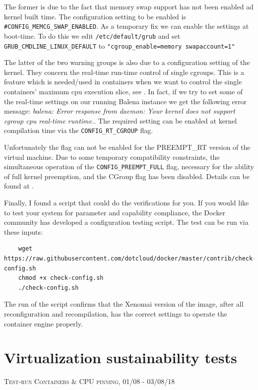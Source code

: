 \documentclass[]{scrartcl}
\begin{document}
The former is due to the fact that memory swap support has not been enabled ad kernel built time. 
The configuration setting to be enabled is \texttt{\#CONFIG\_MEMCG\_SWAP\_ENABLED}. As a temporary fix we can enable the settings at boot-time. 
To do this we edit \texttt{/etc/default/grub} and set 
\texttt{GRUB\_CMDLINE\_LINUX\_DEFAULT} to \texttt{"cgroup\_enable=memory swapaccount=1"}

The latter of the two warning groups is also due to a configuration setting of the kernel. They concern the real-time run-time control of single cgroups. This is a feature which is needed/used in containers when we want to control the single containers' maximum cpu execution slice, see \cite{docker04}. 
In fact, if we try to set some of the real-time settings on our running Balena instance we get the following error message: \textit{balena: Error response from daemon: Your kernel does not support cgroup cpu real-time runtime.}.
The required setting can be enabled at kernel compilation time via the \texttt{CONFIG\_RT\_CGROUP} flag. 

Unfortunately the flag can not be enabled for the PREEMPT\_RT version of the virtual machine. Due to some temporary compatibility constraints, the simultaneous operation of the \texttt{CONFIG\_PREEMPT\_FULL} flag, necessary for the ability of full kernel preemption, and the CGroup flag has been disabled. Details can be found at \cite{lfnd01}.

Finally, I found a script that could do the verifications for you. If you would like to test your system for parameter and capability compliance, the Docker community has developed a configuration testing script. The test can be run via these inputs:

\begin{verbatim}
	wget https://raw.githubusercontent.com/dotcloud/docker/master/contrib/check-config.sh
	chmod +x check-config.sh
	./check-config.sh
\end{verbatim}

The run of the script confirms that the Xenomai version of the image, after all reconfiguration and recompilation, has the correct settings to operate the container engine properly.

\section{Virtualization sustainability tests}
\label{sec:virtsust}
{\small\textsc{Test-run Containers \& CPU pinning, 01/08 - 03/08/18} \bigskip}
\end{document}
